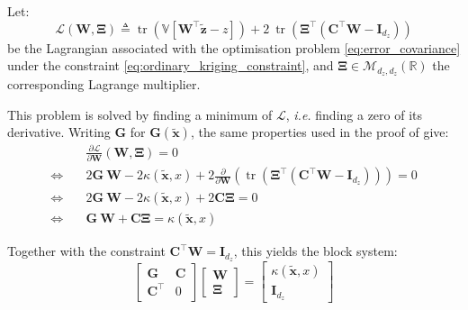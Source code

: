 Let:
\begin{equation}
	\mathcal{L}(\mathbf{W},\boldsymbol{\Xi})\triangleq\operatorname{tr}\left(\mathbb{V}\left[\mathbf{W}^\top\tilde{\mathbf{z}}-z\right]\right)+2\:\operatorname{tr}\left(\boldsymbol{\Xi}^\top\left(\mathbf{C}^\top \mathbf{W}-\mathbf{I}_{d_z}\right)\right)
\end{equation}
be the Lagrangian associated with the optimisation problem \eqref{eq:error_covariance} under the constraint \eqref{eq:ordinary_kriging_constraint}, and $\boldsymbol{\Xi}\in\mathcal{M}_{d_z,d_z}(\mathbb{R})$ the corresponding Lagrange multiplier.

This problem is solved by finding a minimum of $\mathcal{L}$, \textit{i.e.} finding a zero of its derivative. Writing $\mathbf{G}$ for $\mathbf{G}(\tilde{\mathbf{x}})$, the same properties used in the proof of  give:
\begin{equation}
	\begin{aligned}
	&\frac{\partial\mathcal{L}}{\partial \mathbf{W}}(\mathbf{W},\boldsymbol{\Xi})=0\\
	\iff\quad&2\mathbf{G}\:\mathbf{W}-2\kappa(\tilde{\mathbf{x}},x)+2\frac{\partial}{\partial \mathbf{W}}\left(\operatorname{tr}\left(\boldsymbol{\Xi}^\top\left(\mathbf{C}^\top \mathbf{W}-\mathbf{I}_{d_z}\right)\right)\right)=0\\
	\iff\quad&2\mathbf{G}\:\mathbf{W}-2\kappa(\tilde{\mathbf{x}},x)+2\mathbf{C}\boldsymbol{\Xi}=0\\
	\iff\quad&\mathbf{G}\:\mathbf{W}+\mathbf{C}\boldsymbol{\Xi}=\kappa(\tilde{\mathbf{x}},x)
	\end{aligned}\label{eq:Lagrangian_minimum}
\end{equation}

Together with the constraint $\mathbf{C}^\top \mathbf{W}=\mathbf{I}_{d_z}$, this yields the block system:
\begin{equation}
	\begin{bmatrix}
	\mathbf{G}&\mathbf{C}\\\mathbf{C}^\top&0
	\end{bmatrix}\begin{bmatrix}
	\mathbf{W}\\\boldsymbol{\Xi}
	\end{bmatrix}=\begin{bmatrix}
	\kappa(\tilde{\mathbf{x}},x)\\\mathbf{I}_{d_z}
	\end{bmatrix}
\end{equation}

